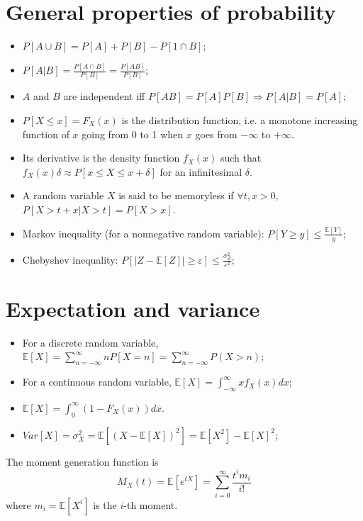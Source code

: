 \documentclass[12pt, openany]{report}
\newcommand{\E}{\mathbb{E}}
\theoremstyle{definition}
\begin{document}
\section{General properties of probability}
\begin{itemize}
  \item $P[A\cup B]=P[A]+P[B]-P[1\cap B]$;
  \item $P[A|B] = \frac{P[A\cap B]}{P[B]} = \frac{P[AB]}{P[B]}$;
  \item $A$ and $B$ are independent iff $P[AB]=P[A]P[B]\Longrightarrow P[A|B]=P[A]$;
  \item $P[X\le x]=F_X(x)$ is the distribution function, i.e. a monotone increasing function of $x$ going from 0 to 1 when $x$ goes from $-\infty$ to $+\infty$.
  \item Its derivative is the density function $f_X(x)$ such that $f_X(x)\delta \approx P[x\le X\le x+\delta]$ for an infinitesimal $\delta$.
  \item A random variable $X$ is said to be memoryless if $\forall t,x>0$, $P[X>t+x|X>t]=P[X>x]$.
  \item Markov inequality (for a nonnegative random variable): $P[Y\ge y] \le \frac{\E[Y]}{y}$;
  \item Chebyshev inequality: $P[|Z-\E[Z]| \ge \varepsilon] \le \frac{\sigma_Z^2}{\varepsilon^2}$;
\end{itemize}
\section{Expectation and variance}
\begin{itemize}
  \item For a discrete random variable, $\E[X]= \sum_{n=-\infty}^\infty nP[X=n]=\sum_{n=-\infty}^\infty P(X>n)$;
  \item For a continuous random variable, $\E[X]=\int_{-\infty}^\infty xf_X(x)dx$;
  \item $\E[X] = \int_0^\infty (1-F_X(x))dx$.
  \item $Var[X] = \sigma_X^2 = \E[(X-\E[X])^2] = \E[X^2] - \E[X]^2$;
\end{itemize}
The moment generation function is 
\begin{equation}
	M_X(t) = \mathbb{E}[e^{tX}] = \sum_{i=0}^\infty \frac{t^im_i}{i!}
\end{equation}
where $m_i=\mathbb{E}[X^i]$ is the $i$-th moment.
\end{document}
